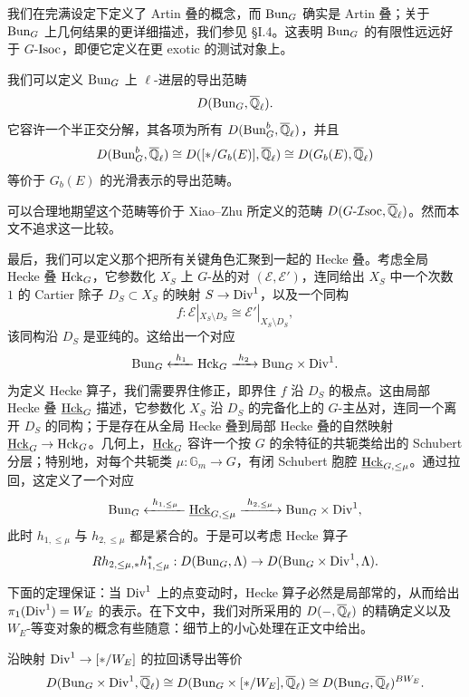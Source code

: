 \begin{remark}%
我们在完满设定下定义了 Artin 叠的概念，而 $\mathrm{Bun}_G$ 确实是 Artin 叠；关于 $\mathrm{Bun}_G$ 上几何结果的更详细描述，我们参见 §I.4。这表明 $\mathrm{Bun}_G$ 的有限性远远好于 $G$-$\mathrm{Isoc}$，即便它定义在更 exotic 的测试对象上。
\end{remark}

我们可以定义 $\mathrm{Bun}_G$ 上 $\ell$-进层的导出范畴
\[
  D(\mathrm{Bun}_G,\overline{\mathbb{Q}}_\ell).
\]
它容许一个半正交分解，其各项为所有 $D(\mathrm{Bun}_G^b,\overline{\mathbb{Q}}_\ell)$，并且
\[
  D(\mathrm{Bun}_G^b,\overline{\mathbb{Q}}_\ell)\cong D([\ast/G_b(E)],\overline{\mathbb{Q}}_\ell)\cong D(G_b(E),\overline{\mathbb{Q}}_\ell)
\]
等价于 $G_b(E)$ 的光滑表示的导出范畴。

\begin{remark}%
可以合理地期望这个范畴等价于 Xiao–Zhu 所定义的范畴 $D(G\text{-}\mathcal{I}\mathrm{soc},\overline{\mathbb{Q}}_\ell)$。然而本文不追求这一比较。
\end{remark}

\leavevmode{}最后，我们可以定义那个把所有关键角色汇聚到一起的 Hecke 叠。考虑全局 Hecke 叠 $\mathrm{Hck}_G$，它参数化 $X_S$ 上 $G$-丛的对 $(\mathcal{E},\mathcal{E}')$，连同给出 $X_S$ 中一个次数 $1$ 的 Cartier 除子 $D_S\subset X_S$ 的映射 $S\to\mathrm{Div}^1$，以及一个同构
\[
  f : \mathcal{E}|_{X_S\setminus D_S}\cong\mathcal{E}'|_{X_S\setminus D_S},
\]
该同构沿 $D_S$ 是亚纯的。这给出一个对应
\[
  \mathrm{Bun}_G \xleftarrow{\ h_1\ } \mathrm{Hck}_G \xrightarrow{\ h_2\ } \mathrm{Bun}_G\times\mathrm{Div}^1.
\]
为定义 Hecke 算子，我们需要界住修正，即界住 $f$ 沿 $D_S$ 的极点。这由局部 Hecke 叠 $\underline{\mathrm{Hck}}_G$ 描述，它参数化 $X_S$ 沿 $D_S$ 的完备化上的 $G$-主丛对，连同一个离开 $D_S$ 的同构；于是存在从全局 Hecke 叠到局部 Hecke 叠的自然映射 $\underline{\mathrm{Hck}}_G\to\mathrm{Hck}_G$。几何上，$\underline{\mathrm{Hck}}_G$ 容许一个按 $G$ 的余特征的共轭类给出的 Schubert 分层；特别地，对每个共轭类 $\mu:\mathbb{G}_m\to G$，有闭 Schubert 胞腔 $\underline{\mathrm{Hck}}_{G,\le\mu}$。通过拉回，这定义了一个对应
\[
  \mathrm{Bun}_G \xleftarrow{\ h_{1,\le\mu}\ } \underline{\mathrm{Hck}}_{G,\le\mu} \xrightarrow{\ h_{2,\le\mu}\ } \mathrm{Bun}_G\times\mathrm{Div}^1,
\]
此时 $h_{1,\le\mu}$ 与 $h_{2,\le\mu}$ 都是紧合的。于是可以考虑 Hecke 算子
\[
  Rh_{2,\le\mu,\ast}h_{1,\le\mu}^\ast : D(\mathrm{Bun}_G,\Lambda)\to D(\mathrm{Bun}_G\times\mathrm{Div}^1,\Lambda).
\]

下面的定理保证：当 $\mathrm{Div}^1$ 上的点变动时，Hecke 算子必然是局部常的，从而给出 $\pi_1(\mathrm{Div}^1)=W_E$ 的表示。在下文中，我们对所采用的 $D(-,\overline{\mathbb{Q}}_\ell)$ 的精确定义以及 $W_E$-等变对象的概念有些随意：细节上的小心处理在正文中给出。

\begin{theorem}%
沿映射 $\mathrm{Div}^1\to[\ast/W_E]$ 的拉回诱导出等价
\[
  D(\mathrm{Bun}_G\times\mathrm{Div}^1,\overline{\mathbb{Q}}_\ell)\cong D(\mathrm{Bun}_G\times[\ast/W_E],\overline{\mathbb{Q}}_\ell)\cong D(\mathrm{Bun}_G,\overline{\mathbb{Q}}_\ell)^{BW_E}.
\]
\end{theorem}

